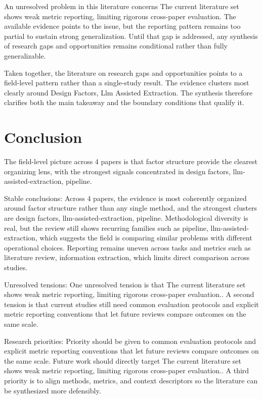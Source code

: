 \documentclass{article}
\begin{document}
An unresolved problem in this literature concerns The current literature set shows weak metric reporting, limiting rigorous cross-paper evaluation. The available evidence points to the issue, but the reporting pattern remains too partial to sustain strong generalization. Until that gap is addressed, any synthesis of research gaps and opportunities remains conditional rather than fully generalizable. \cite{08_2016_zhou_aap,09_2018_jiang_aap}

Taken together, the literature on research gaps and opportunities points to a field-level pattern rather than a single-study result. The evidence clusters most clearly around Design Factors, Llm Assisted Extraction. The synthesis therefore clarifies both the main takeaway and the boundary conditions that qualify it. \cite{08_2016_zhou_aap,09_2018_jiang_aap}

\section{Conclusion}
The field-level picture across 4 papers is that factor structure provide the clearest organizing lens, with the strongest signals concentrated in design factors, llm-assisted-extraction, pipeline. \cite{08_2016_zhou_aap,17_2017_chen_aap}

Stable conclusions: Across 4 papers, the evidence is most coherently organized around factor structure rather than any single method, and the strongest clusters are design factors, llm-assisted-extraction, pipeline. Methodological diversity is real, but the review still shows recurring families such as pipeline, llm-assisted-extraction, which suggests the field is comparing similar problems with different operational choices. Reporting remains uneven across tasks and metrics such as literature review, information extraction, which limits direct comparison across studies. \cite{08_2016_zhou_aap,17_2017_chen_aap}

Unresolved tensions: One unresolved tension is that The current literature set shows weak metric reporting, limiting rigorous cross-paper evaluation.. A second tension is that current studies still need common evaluation protocols and explicit metric reporting conventions that let future reviews compare outcomes on the same scale. \cite{08_2016_zhou_aap,17_2017_chen_aap}

Research priorities: Priority should be given to common evaluation protocols and explicit metric reporting conventions that let future reviews compare outcomes on the same scale. Future work should directly target The current literature set shows weak metric reporting, limiting rigorous cross-paper evaluation.. A third priority is to align methods, metrics, and context descriptors so the literature can be synthesized more defensibly. \cite{08_2016_zhou_aap,17_2017_chen_aap}
\end{document}
